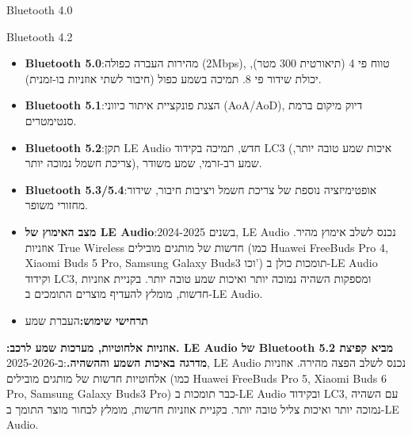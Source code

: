 
Bluetooth 4.0


Bluetooth 4.2


\begin{itemize}
  \item \textbf{Bluetooth 5.0}:מהירות העברה כפולה (2Mbps), טווח פי 4 (תיאורטית 300 מטר), יכולת שידור פי 8. תמיכה בשמע כפול (חיבור לשתי אוזניות בו-זמנית).
  \item \textbf{Bluetooth 5.1}:הצגת פונקציית איתור כיווני (AoA/AoD), דיוק מיקום ברמת סנטימטרים.
  \item \textbf{Bluetooth 5.2}:תקן LE Audio חדש, תמיכה בקידוד LC3 (איכות שמע טובה יותר, צריכת חשמל נמוכה יותר), שמע רב-זרמי, שמע משודר.
  \item \textbf{Bluetooth 5.3/5.4}:אופטימיזציה נוספת של צריכת חשמל ויציבות חיבור, שידור מחזורי משופר.
  \item \textbf{מצב האימוץ של LE Audio}:בשנים 2024-2025, LE Audio נכנס לשלב אימוץ מהיר. אוזניות True Wireless חדשות של מותגים מובילים (כמו Huawei FreeBuds Pro 4, Xiaomi Buds 5 Pro, Samsung Galaxy Buds3 וכו') תומכות כולן ב-LE Audio וקידוד LC3, ומספקות השהיה נמוכה יותר ואיכות שמע טובה יותר. בקניית אוזניות חדשות, מומלץ להעדיף מוצרים התומכים ב-LE Audio.
  \item \textbf{תרחישי שימוש:}העברת שמע
\end{itemize}

\textbf{:אוזניות אלחוטיות, מערכות שמע לרכב. LE Audio של Bluetooth 5.2 מביא קפיצת מדרגה באיכות השמע וההשהיה.}:ב-2025-2026, LE Audio נכנס לשלב הפצה מהירה. אוזניות אלחוטיות חדשות של מותגים מובילים (כמו Huawei FreeBuds Pro 5, Xiaomi Buds 6 Pro, Samsung Galaxy Buds3 Pro) כבר תומכות ב-LE Audio ובקידוד LC3, עם השהיה נמוכה יותר ואיכות צליל טובה יותר. בקניית אוזניות חדשות, מומלץ לבחור מוצר התומך ב-LE Audio.


